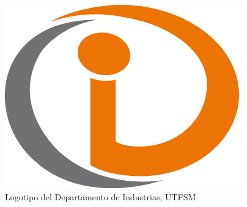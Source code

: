 \begin{figure}[ht!]
\centering
\includegraphics[width=.3\textwidth]{figures/logoind.png}
\caption{Logotipo del Departamento de Industrias, UTFSM }
\label{fig:logoind1}
\end{figure}

